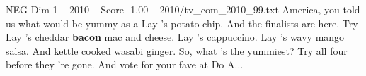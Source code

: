 \begin{textsample}{NEG Dim 1 – 2010 – Score -1.00 – 2010/tv\_com\_2010\_99.txt}  \label{ex:f1_neg_039}
America, you told us what would be yummy as a Lay 's potato chip.
And the finalists are here.
Try Lay 's cheddar \textbf{bacon} mac and cheese.
Lay 's cappuccino.
Lay 's wavy mango salsa.
And kettle cooked wasabi ginger.
So, what 's the yummiest?
Try all four before they 're gone.
And vote for your fave at Do A...

\end{textsample}
